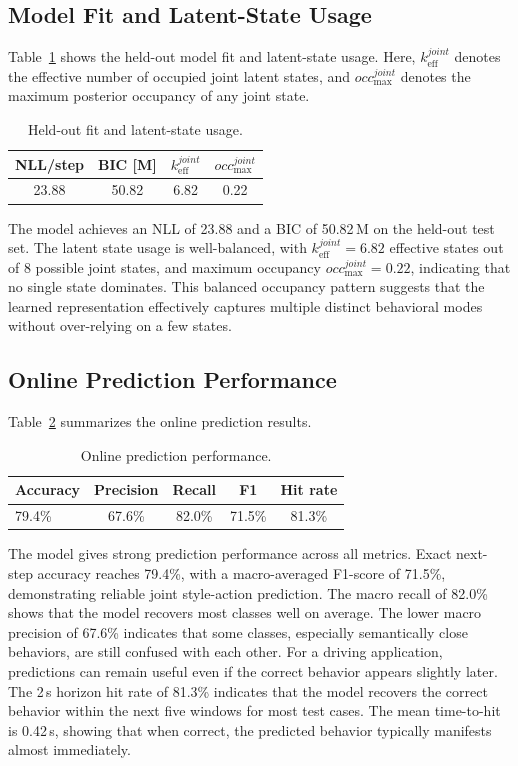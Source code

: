 \documentclass[upint,subscriptcorrection,varvw,hyphenate,balance,greek,russian,vietnamese,german]{asmeconf} %
\begin{document}
\subsection{Model Fit and Latent-State Usage}
Table~\ref{tab:model_fit_latent_usage} shows the held-out model fit and latent-state usage.
Here, $k_{\mathrm{eff}}^{joint}$ denotes the effective number of occupied joint latent states, and 
$occ_{\max}^{joint}$ denotes the maximum posterior occupancy of any joint state.

\begin{table}[h]
\centering
\caption{Held-out fit and latent-state usage.}
\label{tab:model_fit_latent_usage}
\begin{tabular}{cccc}
\toprule
NLL/step & BIC [M] &  $k_{\mathrm{eff}}^{joint}$ & $occ_{\max}^{joint}$ \\
\midrule
23.88 & 50.82 & 6.82 & 0.22 \\
\bottomrule
\end{tabular}
\end{table}

The model achieves an NLL of 23.88 and a BIC of 50.82\,M on the held-out test set. 
The latent state usage is well-balanced, with $k_{\mathrm{eff}}^{joint}=6.82$ effective states out of 8 possible joint states, 
and maximum occupancy $occ_{\max}^{joint}=0.22$, indicating that no single state dominates.
This balanced occupancy pattern suggests that the learned representation effectively captures multiple distinct behavioral modes without over-relying on a few states.


\subsection{Online Prediction Performance}
Table~\ref{tab:online_prediction_results} summarizes the online prediction results.
\begin{table}[h]
\centering
\caption{Online prediction performance.}
\label{tab:online_prediction_results}
\begin{tabular}{lcccc}
\toprule
Accuracy & Precision & Recall & F1 & Hit rate \\
\midrule
79.4\% & 67.6\% & 82.0\% & 71.5\% & 81.3\% \\
\bottomrule
\end{tabular}
\end{table}

The model gives strong prediction performance across all metrics. 
Exact next-step accuracy reaches 79.4\%, with a macro-averaged F1-score of 71.5\%, demonstrating reliable joint style-action prediction. 
The macro recall of 82.0\% shows that the model recovers most classes well on average. 
The lower macro precision of 67.6\% indicates that some classes, especially semantically close behaviors, are still confused with each other. 
For a driving application, predictions can remain useful even if the correct behavior appears slightly later. 
The 2\,s horizon hit rate of 81.3\% indicates that the model recovers the correct behavior within the next five windows for most test cases. 
The mean time-to-hit is 0.42\,s, showing that when correct, the predicted behavior typically manifests almost immediately.
\end{document}

